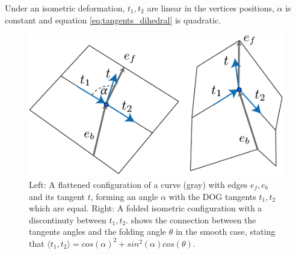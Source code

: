 Under an isometric deformation, $t_1,t_2$ are linear in the vertices positions, $\alpha$ is constant and equation \eqref{eq:tangents_dihedral} is quadratic.
\begin{figure} [h]
	\centering
	\includegraphics[width=0.7\linewidth]{figures/fold_angle_and_tangent_angles}
	\caption{Left: A flattened configuration of a curve (gray) with edges $e_f,e_b$ and its tangent $t$, forming an angle $\alpha$ with the DOG tangents $t_1,t_2$ which are equal. Right: A folded isometric configuration with a discontinuty between $t_1,t_2$.  shows the connection between the tangents angles and the folding angle $\theta$ in the smooth case, stating that $\langle t_1, t_2 \rangle = cos(\alpha)^2 + sin^2(\alpha) cos(\theta)$. }
	\label{fig:fold_angle_and_tangent_angles}
\end{figure}


